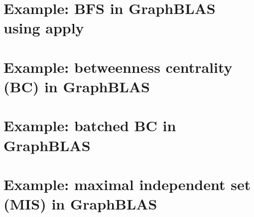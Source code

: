 \pagebreak
\nolinenumbers
\section{Example: BFS in GraphBLAS using apply}
{\scriptsize

}

\pagebreak
\nolinenumbers
\section{Example: betweenness centrality (BC) in GraphBLAS}
{\scriptsize

}

%

\pagebreak
\nolinenumbers
\section{Example: batched BC in GraphBLAS}
{\scriptsize

}

\pagebreak
\nolinenumbers
\section{Example: maximal independent set (MIS) in GraphBLAS}
{\scriptsize

}

\pagebreak
